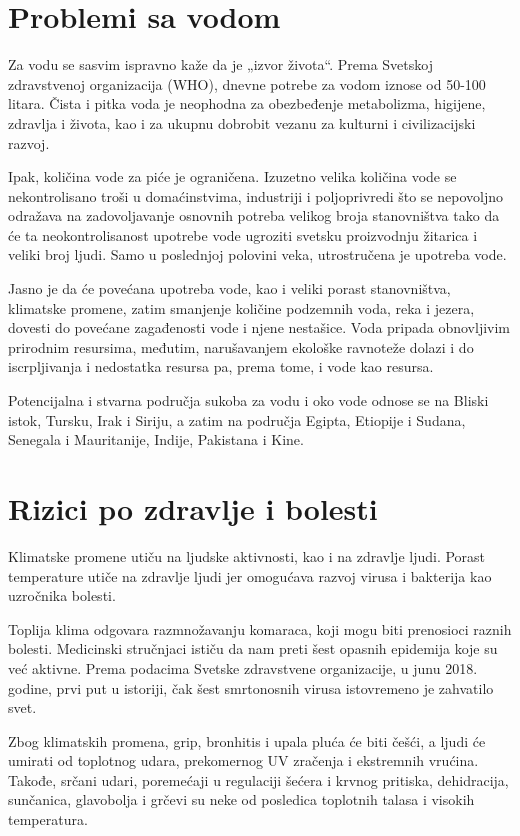 \documentclass[a4paper]{article}
\begin{document}
\section{Problemi sa vodom}
\label{sec:problemi_sa_vodom}
Za vodu se sasvim ispravno kaže da je „izvor života“. Prema Svetskoj zdravstvenoj organizacija (WHO), dnevne potrebe za vodom iznose od 50-100 litara. Čista i pitka voda je neophodna za obezbeđenje metabolizma, higijene,  zdravlja i života, kao i za ukupnu dobrobit vezanu za kulturni i civilizacijski razvoj.

Ipak, količina vode za piće je ograničena. Izuzetno velika količina vode se nekontrolisano troši u domaćinstvima, industriji i poljoprivredi što se nepovoljno odražava na zadovoljavanje osnovnih potreba velikog broja stanovništva tako da će ta neokontrolisanost upotrebe vode ugroziti svetsku proizvodnju žitarica i veliki broj ljudi. Samo u poslednjoj polovini veka, utrostručena je upotreba vode.

Jasno je da će povećana upotreba vode, kao i veliki porast stanovništva, klimatske promene, zatim smanjenje količine podzemnih voda, reka i jezera, dovesti do povećane zagađenosti vode i njene nestašice. Voda pripada obnovljivim prirodnim resursima, međutim, narušavanjem ekološke ravnoteže dolazi i do iscrpljivanja i nedostatka resursa pa, prema tome, i vode kao resursa.

Potencijalna i stvarna područja sukoba za vodu i oko vode odnose se na Bliski istok, Tursku, Irak i Siriju, a zatim na područja Egipta, Etiopije i Sudana, Senegala i Mauritanije, Indije, Pakistana i Kine.


\section{Rizici po zdravlje i bolesti}
\label{sec:rizici_po_zdravlje_i_bolesti}
Klimatske promene utiču na ljudske aktivnosti, kao i na zdravlje ljudi. Porast temperature utiče na zdravlje ljudi jer omogućava razvoj virusa i bakterija kao uzročnika bolesti.

Toplija klima odgovara razmnožavanju komaraca, koji mogu biti prenosioci raznih bolesti. Medicinski stručnjaci ističu da nam preti šest opasnih epidemija koje su već aktivne. Prema podacima Svetske zdravstvene organizacije, u junu 2018. godine, prvi put u istoriji, čak šest smrtonosnih virusa istovremeno je zahvatilo svet.

Zbog klimatskih promena, grip, bronhitis i upala pluća će biti češći, a ljudi će umirati od toplotnog udara, prekomernog UV zračenja i ekstremnih vrućina. Takođe, srčani udari, poremećaji u regulaciji šećera i krvnog pritiska, dehidracija, sunčanica, glavobolja i grčevi su neke od posledica toplotnih talasa i visokih temperatura.
\end{document}
